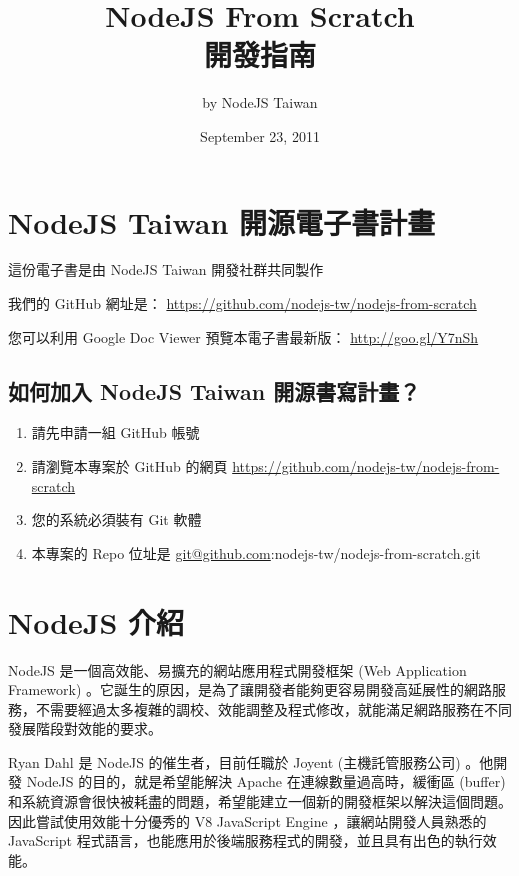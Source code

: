 \documentclass[a4paper,12pt,english]{sphinxmanual}
\title{NodeJS From Scratch\\開發指南}
\date{September 23, 2011}
\author{by NodeJS Taiwan}
\begin{document}
\maketitle
\tableofcontents
{}\label{index::doc}



\chapter{NodeJS Taiwan 開源電子書計畫}
\label{README:nodejs-from-scratch}\label{README::doc}\label{README:nodejs-taiwan}
這份電子書是由 NodeJS Taiwan 開發社群共同製作

我們的 GitHub 網址是：
\href{https://github.com/nodejs-tw/nodejs-from-scratch}{https://github.com/nodejs-tw/nodejs-from-scratch}

您可以利用 Google Doc Viewer 預覽本電子書最新版：
\href{http://goo.gl/Y7nSh}{http://goo.gl/Y7nSh}


\section{如何加入 NodeJS Taiwan 開源書寫計畫？}
\label{README:id1}\begin{enumerate}
\item {} 
請先申請一組 GitHub 帳號

\item {} 
請瀏覽本專案於 GitHub 的網頁
\href{https://github.com/nodejs-tw/nodejs-from-scratch}{https://github.com/nodejs-tw/nodejs-from-scratch}

\item {} 
您的系統必須裝有 Git 軟體

\item {} 
本專案的 Repo 位址是
\href{mailto:git@github.com}{git@github.com}:nodejs-tw/nodejs-from-scratch.git

\end{enumerate}


\chapter{NodeJS 介紹}
\label{nodejs_intro::doc}\label{nodejs_intro:nodejs}
NodeJS 是一個高效能、易擴充的網站應用程式開發框架 (Web Application Framework) 。它誕生的原因，是為了讓開發者能夠更容易開發高延展性的網路服務，不需要經過太多複雜的調校、效能調整及程式修改，就能滿足網路服務在不同發展階段對效能的要求。

Ryan Dahl 是 NodeJS 的催生者，目前任職於 Joyent (主機託管服務公司) 。他開發 NodeJS 的目的，就是希望能解決 Apache 在連線數量過高時，緩衝區 (buffer) 和系統資源會很快被耗盡的問題，希望能建立一個新的開發框架以解決這個問題。因此嘗試使用效能十分優秀的 V8 JavaScript Engine ，讓網站開發人員熟悉的 JavaScript 程式語言，也能應用於後端服務程式的開發，並且具有出色的執行效能。
\end{document}
